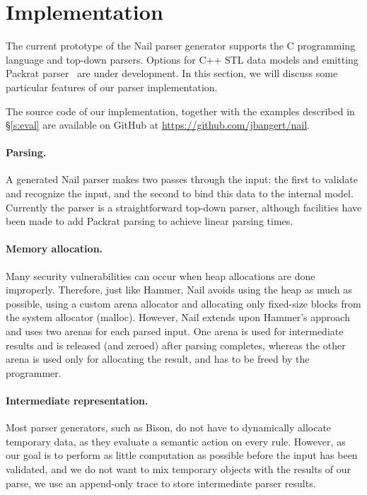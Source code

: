 \section{Implementation}
\label{s:impl}

The current prototype of the Nail parser generator supports the C programming
language and top-down parsers. Options for C++ STL data models and emitting
Packrat parser~\cite{packrat-parsing:icfp02} are under development. In
this section, we will discuss some particular features of our parser
implementation.

The source code of our implementation, together with the examples described in
\S\ref{s:eval} are available on GitHub at \url{https://github.com/jbangert/nail}.



\paragraph{Parsing.}

A generated Nail parser makes two passes through the input: the first to
validate and recognize the input, and the second to bind this data to the internal
model. Currently the parser is a straightforward top-down parser, although
facilities have been made to add Packrat parsing to achieve linear parsing
times.

\paragraph{Memory allocation.}

Many security vulnerabilities can occur when heap allocations are done
improperly. Therefore, just like Hammer, Nail avoids using the heap as much as
possible, using a custom arena allocator and allocating only fixed-size blocks
from the system allocator (malloc). However, Nail extends upon Hammer's approach and uses two
arenas for each parsed input. One arena is used for intermediate results and is
released (and zeroed) after parsing completes, whereas the other arena is used only
for allocating the result, and has to be freed by the programmer.

\paragraph{Intermediate representation.}

Most parser generators, such as Bison, do not have to dynamically allocate
temporary data, as they evaluate a semantic action on every rule. However, as
our goal is to perform as little computation as possible before the input
has been validated, and we do not want to mix temporary objects with the
results of our parse, we use an append-only trace to store intermediate parser
results. 

